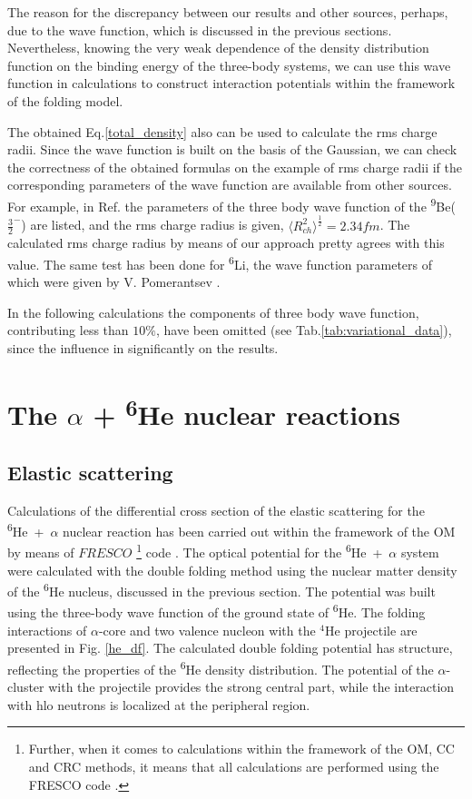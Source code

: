 \documentclass[
12pt, %
oneside, %
english, %
onehalfspacing, %
onehalfspacing, %
headsepline, %
]{MastersDoctoralThesis} %
\newcommand{\he}{\textsuperscript{6}He\xspace}
\newcommand{\li}{\textsuperscript{6}Li\xspace}
\newcommand{\be}{\textsuperscript{9}Be\xspace}
\begin{document}
The reason for the discrepancy between our results and other sources, perhaps, due to the wave function, which is discussed in the previous sections. Nevertheless, knowing the very weak dependence of the density distribution function on the binding energy of the three-body systems, we can use this wave function in calculations to construct interaction potentials within the framework of the folding model.

The obtained Eq.\ref{total_density} also can be used to calculate the rms charge radii. 
Since the wave function is built on the basis of the Gaussian, we can check the correctness of the obtained formulas on the example of rms charge radii if the corresponding parameters of the wave function are available from other sources.
For example, in Ref. \cite{voronchev1994study} the parameters of the three body wave function of the \be ($\tfrac{3}{2}^-$) are listed, and the rms charge radius  is given, $\langle R_{ch}^2 \rangle^{\frac{1}{2}} = 2.34 fm$. 
The calculated rms charge radius by means of our approach pretty agrees with this value. 
The same test has been done for \li, the wave function parameters of which were given by V. Pomerantsev \cite{pomerantsevPrivate}.

In the following calculations the components of three body wave function, contributing less than $10\%$, have been omitted (see Tab.\ref{tab:variational_data}), since the  influence in significantly on the results.


\section{The $\alpha$ + \he nuclear reactions }
\subsection{Elastic scattering}

Calculations of the differential cross section of the elastic scattering for the \he~+~$\alpha$ nuclear reaction has been carried out within the framework of the OM by means of $FRESCO$
\footnote{Further, when it comes to calculations within the framework of the OM, CC and CRC methods, it means that all calculations are performed using the FRESCO code \cite{fresco}.} 
code \cite{fresco}.
The optical potential for the \he~+~$\alpha$ system were calculated with the double folding method using the nuclear matter density of the \he nucleus, discussed in the previous section. 
The potential was built using the three-body wave function of the ground state of \he. 
The folding interactions of $\alpha$-core and two valence nucleon with the $^4$He projectile are presented in Fig. \ref{he_df}.
The calculated double folding potential has structure, reflecting the properties of the \he density distribution.
The potential of the $\alpha$-cluster with the projectile provides the strong central part, while the interaction with hlo neutrons is localized at the peripheral region.
\end{document}

